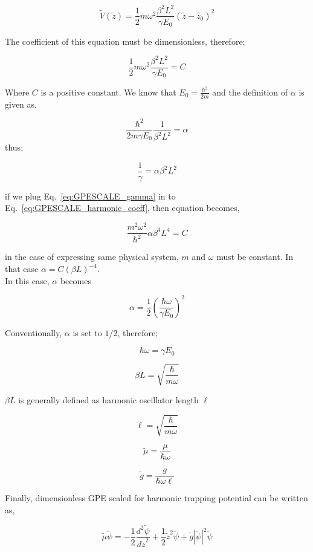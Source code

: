 \documentclass[a4paper,times,12pt]{article}
\begin{document}
\begin{equation}
\label{eq:GPESCALE_harmonic_energy_transform}
    \widetilde{V}(\widetilde{z}) = \frac{1}{2} m\omega^2 \frac{\beta^2 L^2}{\gamma E_0} (\widetilde{z}-\widetilde{z_0})^2  
\end{equation}

The coefficient of this equation must be dimensionless, therefore;

\begin{equation}
\label{eq:GPESCALE_harmonic_coeff}
    \frac{1}{2} m\omega^2 \frac{\beta^2 L^2}{\gamma E_0} = C
\end{equation}

Where $C$ is a positive constant. We know that $E_0 = \frac{\hbar^2}{2m}$ and the definition of $\alpha$ is given as,

\begin{equation}
\label{eq:GPESCALE_alpha}
    \frac{\hbar^2}{2m\gamma E_0} \frac{1}{\beta^2 L^2} = \alpha
\end{equation}
thus;

\begin{equation}
\label{eq:GPESCALE_gamma}
     \frac{1}{\gamma} = \alpha \beta^2 L^2
\end{equation}

if we plug Eq.~\eqref{eq:GPESCALE_gamma} in to Eq.~\eqref{eq:GPESCALE_harmonic_coeff}, then equation becomes,

\begin{equation}
\label{eq:GPESCALE_harmonic_coeff_2}
    \frac{m^2\omega^2}{\hbar^2} \alpha \beta^4 L^4 = C 
\end{equation} 

in the case of expressing same physical system, $m$ and $\omega$ must be constant. In that case $\alpha = C (\beta L)^{-4}$.\\


In this case, $\alpha$ becomes

$$ \alpha =  \frac{1}{2} \left(\frac{\hbar \omega}{\gamma E_0}\right)^2 $$

Conventionally, $\alpha$ is set to $1/2$, therefore;

$$ \hbar \omega = \gamma E_0 $$

$$ \beta L = \sqrt{\frac{\hbar}{m\omega}} $$ 

$ \beta L $ is generally defined as harmonic oscillator length $\ell$

$$ \ell = \sqrt{\frac{\hbar}{m\omega}} $$ 

$$ \widetilde{\mu} = \frac{\mu}{\hbar \omega} $$ 

$$ \widetilde{g} = \frac{g}{\hbar \omega \ell} $$

Finally, dimensionless GPE scaled for harmonic trapping potential can be written as,

$$\widetilde{\mu} \widetilde{\psi} = -\frac{1}{2}\frac{d^2\widetilde{\psi}}{d\widetilde{z}^2} + \frac{1}{2}\widetilde{z}^2\widetilde{\psi} + \widetilde{g}|\widetilde{\psi}|^2 \widetilde{\psi} $$
\end{document}
